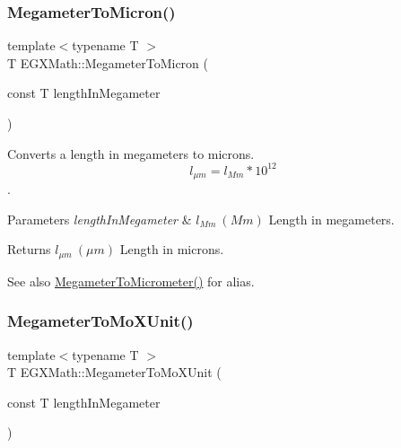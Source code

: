 \subsubsection{\texorpdfstring{Megameter\+To\+Micron()}{MegameterToMicron()}}
{\footnotesize\ttfamily template$<$typename T $>$ \\
T E\+G\+X\+Math\+::\+Megameter\+To\+Micron (\begin{DoxyParamCaption}\item[{const T}]{length\+In\+Megameter }\end{DoxyParamCaption})}



Converts a length in megameters to microns. \[ l_{\mu m}=l_{Mm} * 10^{12} \]. 


\begin{DoxyParams}{Parameters}
{\em length\+In\+Megameter} & $ l_{Mm}\ (Mm)$ Length in megameters. \\
\hline
\end{DoxyParams}
\begin{DoxyReturn}{Returns}
$ l_{\mu m}\ (\mu m)$ Length in microns. 
\end{DoxyReturn}
\begin{DoxySeeAlso}{See also}
\mbox{\hyperlink{group___e_g_x_math-_conversions-_length_conversions-_s_i-_megameter-_s_i_ga4b0dc1e6dd503c23428038a69ff07146}{Megameter\+To\+Micrometer()}} for alias. 
\end{DoxySeeAlso}
\mbox{\label{group___e_g_x_math-_conversions-_length_conversions-_s_i-_megameter-_non-_s_i_ga134a9fb2603b93c739c4ee58864f69c6}} 
\subsubsection{\texorpdfstring{Megameter\+To\+Mo\+X\+Unit()}{MegameterToMoXUnit()}}
{\footnotesize\ttfamily template$<$typename T $>$ \\
T E\+G\+X\+Math\+::\+Megameter\+To\+Mo\+X\+Unit (\begin{DoxyParamCaption}\item[{const T}]{length\+In\+Megameter }\end{DoxyParamCaption})}




